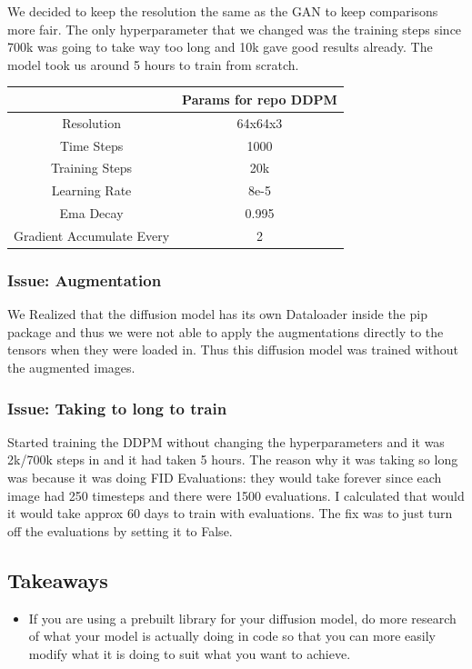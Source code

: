 \documentclass[]{article}
\begin{document}
\noindent We decided to keep the resolution the same as the GAN to
keep comparisons more fair. The only hyperparameter that we changed was
the training steps since 700k was going to take way too long
and 10k gave good results already. The model took us around 5 hours to train from scratch.

\begin{center}
\begin{tabular}{|c|c|}
\hline
& Params for repo DDPM \\ \hline
Resolution & 64x64x3 \\ \hline
Time Steps & 1000 \\ \hline
Training Steps & 20k \\ \hline
Learning Rate & 8e-5 \\ \hline
Ema Decay & 0.995 \\ \hline
Gradient Accumulate Every & 2 \\ \hline
\end{tabular}
\end{center}

\subsubsection*{Issue: Augmentation}
We Realized that the diffusion model has its own Dataloader inside the pip package and thus we were
not able to apply the augmentations directly to the tensors when they were loaded in. Thus this diffusion model was trained without the augmented images.


\subsubsection*{Issue: Taking to long to train}
Started training the DDPM without changing the hyperparameters and it was 2k/700k steps in and it had taken 5 hours.
The reason why it was taking so long was because it was doing FID Evaluations: they would take forever
since each image had 250 timesteps and there were 1500 evaluations.
I calculated that would it would take approx 60 days to train with evaluations. The fix was to
just turn off the evaluations by setting it to False.

\subsection*{Takeaways}
\begin{itemize}
    \item If you are using a prebuilt library for your diffusion model, do more research of what your model is actually doing in code so that you can more easily modify what it is doing to suit what you want to achieve.
\end{itemize}
\end{document}
